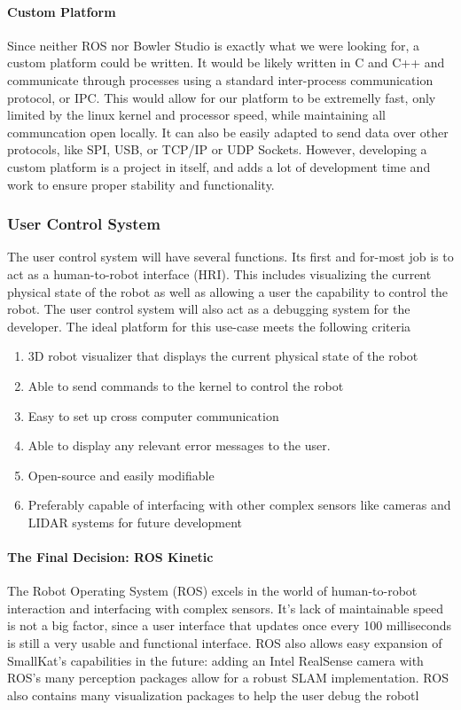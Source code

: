 \paragraph*{Custom Platform}
Since neither ROS nor Bowler Studio is exactly what we were looking for, a custom platform could be written. It would be likely written in C and C++ and communicate through processes using a standard inter-process communication protocol, or IPC. This would allow for our platform to be extremelly fast, only limited by the linux kernel and processor speed, while maintaining all communcation open locally. It can also be easily adapted to send data over other protocols, like SPI, USB, or TCP/IP or UDP Sockets. However, developing a custom platform is a project in itself, and adds a lot of development time and work to ensure proper stability and functionality.

\subsubsection{User Control System}
The user control system will have several functions. Its first and for-most job is to act as a human-to-robot interface (HRI). This includes visualizing the current physical state of the robot as well as allowing a user the capability to control the robot. The user control system will also act as a debugging system for the developer. The ideal platform for this use-case meets the following criteria

\begin{enumerate}
    \item 3D robot visualizer that displays the current physical state of the robot
    \item Able to send commands to the kernel to control the robot
    \item Easy to set up cross computer communication
    \item Able to display any relevant error messages to the user.
    \item Open-source and easily modifiable
    \item Preferably capable of interfacing with other complex sensors like cameras and LIDAR systems for future development
\end{enumerate}

\paragraph*{The Final Decision: ROS Kinetic}
The Robot Operating System (ROS) excels in the world of human-to-robot interaction and interfacing with complex sensors. It's lack of maintainable speed is not a big factor, since a user interface that updates once every 100 milliseconds is still a very usable and functional interface. ROS also allows easy expansion of SmallKat's capabilities in the future: adding an Intel RealSense camera with ROS's many perception packages allow for a robust SLAM implementation. ROS also contains many visualization packages to help the user debug the robotl

